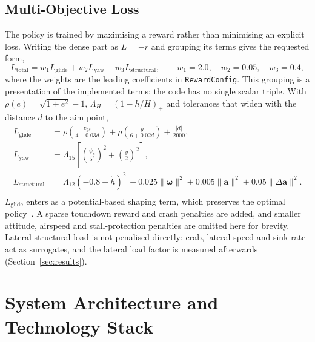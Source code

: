 \documentclass[10pt,a4paper]{article}
\begin{document}
\subsection{Multi-Objective Loss}

The policy is trained by maximising a reward rather than minimising an explicit loss.
Writing the dense part as \(L=-r\) and grouping its terms gives the requested form,
\begin{equation}
L_{\mathrm{total}}=w_1L_{\mathrm{glide}}+w_2L_{\mathrm{yaw}}+w_3L_{\mathrm{structural}},
\qquad w_1=2.0,\quad w_2=0.05,\quad w_3=0.4,
\label{eq:loss}
\end{equation}
where the weights are the leading coefficients in \texttt{RewardConfig}. This grouping
is a presentation of the implemented terms; the code has no single scalar triple. With
\(\rho(e)=\sqrt{1+e^2}-1\), \(\Lambda_H=(1-h/H)_+\) and tolerances that widen with
the distance \(d\) to the aim point,
\begin{align}
L_{\mathrm{glide}}&=\rho\left(\frac{e_{gs}}{4+0.03d}\right)+\rho\left(\frac{y}{6+0.02d}\right)+\frac{|d|}{2000},\label{eq:lglide}\\
L_{\mathrm{yaw}}&=\Lambda_{15}\left[\left(\frac{\psi_e}{5^\circ}\right)^2+\left(\frac{\dot{y}}{2}\right)^2\right],\label{eq:lyaw}\\
L_{\mathrm{structural}}&=\Lambda_{12}\left(-0.8-\dot{h}\right)_+^2+0.025\lVert\boldsymbol{\omega}\rVert^2+0.005\lVert\mathbf{a}\rVert^2+0.05\lVert\Delta\mathbf{a}\rVert^2.\label{eq:lstruct}
\end{align}
\(L_{\mathrm{glide}}\) enters as a potential-based shaping term, which preserves the
optimal policy~\cite{ng1999shaping}. A sparse touchdown reward and crash penalties
are added, and smaller attitude, airspeed and stall-protection penalties are omitted here for brevity. Lateral structural load is not penalised directly: crab, lateral speed and
sink rate act as surrogates, and the lateral load factor is measured afterwards
(Section~\ref{sec:results}).

\section{System Architecture and Technology Stack}
\end{document}
